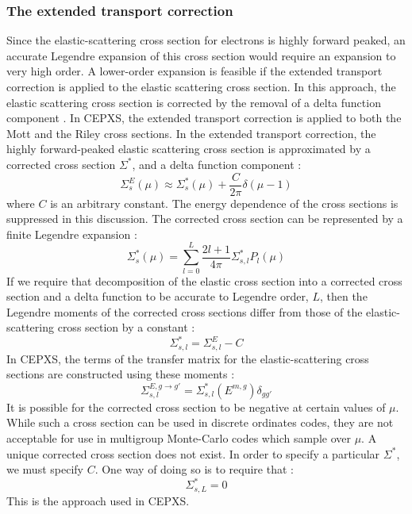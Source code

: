\subsubsection{The extended transport correction}
Since the elastic-scattering cross section for electrons is highly forward
peaked, an accurate Legendre expansion of this cross section would require an
expansion to very high order. A lower-order expansion is feasible if the
extended transport correction is applied to the elastic scattering cross
section. In this approach, the elastic scattering cross section is corrected
by the removal of a delta function component \cite{lathrop}. In CEPXS, the extended 
transport correction is applied to both the Mott and the Riley cross sections. 
In the extended transport correction, the highly forward-peaked elastic scattering
cross section is approximated by a corrected cross section $\Sigma^*$, and a
delta function component :
\begin{equation}
\Sigma_s^E(\mu) \approx \Sigma_s^*(\mu) + \frac{C}{2\pi} \delta (\mu-1)
\end{equation}
where $C$ is an arbitrary constant. The energy dependence of the cross
sections is suppressed in this discussion. The corrected cross section can be
represented by a finite Legendre expansion :
\begin{equation}
\Sigma_s^*(\mu) = \sum_{l=0}^{L} \frac{2l+1}{4 \pi} \Sigma_{s,l}^*
P_l(\mu)
\end{equation}
If we require that decomposition of the elastic cross section into a corrected
cross section and a delta function to be accurate to Legendre order, $L$, then
the Legendre moments of the corrected cross sections differ from those of the
elastic-scattering cross section by a constant :
\begin{equation}
\Sigma_{s,l}^* = \Sigma_{s,l}^E- C
\end{equation}
In CEPXS, the terms of the transfer matrix for the elastic-scattering cross
sections are constructed using these moments :
\begin{equation}
\Sigma_{s,l}^{E,g\rightarrow g'} =
\Sigma_{s,l}^{*}(E^{m,g})\delta_{gg'}
\end{equation}
It is possible for the corrected cross section to be negative at certain
values of $\mu$. While such a cross section can be used in discrete ordinates
codes, they are not acceptable for use in multigroup Monte-Carlo codes which
sample over $\mu$. A unique corrected cross section does not exist. In order
to specify a particular $\Sigma^*$, we must specify $C$. One way of doing so
is to require that :
\begin{equation}
\Sigma_{s,L}^* =0
\end{equation}
This is the approach used in CEPXS.

